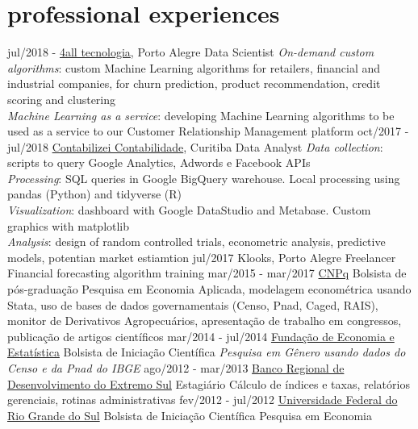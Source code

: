 \documentclass[]{friggeri-cv}
\begin{document}
\section{professional experiences}

\begin{entrylist}
  \entry
    {jul/2018 - }
    {\href{https://www.4all.com/}{4all tecnologia}, Porto Alegre}
    {Data Scientist}
    {\emph{On-demand custom algorithms}: custom Machine Learning algorithms for retailers, financial and industrial companies, for churn prediction, product recommendation, credit scoring and clustering\\
     \emph{Machine Learning as a service}: developing Machine Learning algorithms to be used as a service to our Customer Relationship Management platform}
  \entry
    {oct/2017 - jul/2018}
    {\href{https://www.contabilizei.com.br}{Contabilizei Contabilidade}, Curitiba}
    {Data Analyst}
    {\emph{Data collection}: scripts to query Google Analytics, Adwords e Facebook APIs\\
     \emph{Processing}: SQL queries in Google BigQuery warehouse. Local processing using pandas (Python) and tidyverse (R) \\
     \emph{Visualization}: dashboard with Google DataStudio and Metabase. Custom graphics with matplotlib \\
     \emph{Analysis}: design of random controlled trials, econometric analysis, predictive models, potentian market estiamtion}
  \entry
    {jul/2017}
    {Klooks, Porto Alegre}
    {Freelancer}
    {Financial forecasting algorithm training}
  \entry
    {mar/2015 - mar/2017}
    {\href{cnpq.br}{CNPq}}
    {Bolsista de pós-graduação}
    {Pesquisa em Economia Aplicada, modelagem econométrica usando Stata, uso de bases de dados governamentais (Censo, Pnad, Caged, RAIS), monitor de Derivativos Agropecuários, apresentação de trabalho em congressos, publicação de artigos científicos}
  \entry
    {mar/2014 - jul/2014}
    {\href{https://www.fee.rs.gov.br}{Fundação de Economia e Estatística}}
    {Bolsista de Iniciação Científica}
    {\emph{Pesquisa em Gênero usando dados do Censo e da Pnad do IBGE}}
  \entry
    {ago/2012 - mar/2013}
    {\href{http://www.brde.com.br}{Banco Regional de Desenvolvimento do Extremo Sul}}
    {Estagiário}
    {Cálculo de índices e taxas, relatórios gerenciais, rotinas administrativas}
  \entry
    {fev/2012 - jul/2012}
    {\href{http://www.ufrgs.br}{Universidade Federal do Rio Grande do Sul}}
    {Bolsista de Iniciação Científica}
    {Pesquisa em Economia}
\end{entrylist}
\end{document}
